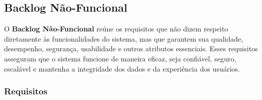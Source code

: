 \usepackage{longtable}

\renewcommand{\arraystretch}{1.2} %

\subsection{Backlog Não-Funcional}

O \textbf{Backlog Não-Funcional} reúne os requisitos que não dizem respeito diretamente às funcionalidades do sistema, mas que garantem sua qualidade, desempenho, segurança, usabilidade e outros atributos essenciais. Esses requisitos asseguram que o sistema funcione de maneira eficaz, seja confiável, seguro, escalável e mantenha a integridade dos dados e da experiência dos usuários.

\subsubsection*{Requisitos}

